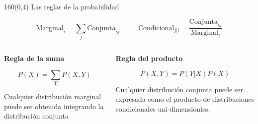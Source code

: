 \documentclass[shownotes,aspectratio=169]{beamer}
\begin{document}
\begin{frame}[plain]
\begin{textblock}{160}(0,4)
\centering \Large Las reglas de la probabilidad
\end{textblock}


\vspace{0.75cm}



\begin{equation*}
  \text{Marginal}_{i} = \sum_j \text{Conjunta}_{ij}  \ \ \ \ \ \ \ \ \ \ \ \  \text{Condicional}_{j|i} = \frac{\text{Conjunta}_{ij}}{\text{Marginal}_{i}}
\end{equation*}

\pause
\vspace{0.75cm}


\begin{columns}[t]
\begin{column}{0.5\textwidth}
 \centering \textbf{Regla de la suma}
 
 
\begin{equation*}
 P(X) = \sum_Y P(X,Y)
\end{equation*}
 
 \justifying \footnotesize
  Cualquier distribución marginal puede ser obtenida integrando la distribución conjunta

 \end{column}
 \begin{column}{0.5\textwidth}
\centering  \textbf{Regla del producto}

\begin{equation*}
 P(X,Y) = P(Y|X) P(X)
\end{equation*}

 \justifying \footnotesize
Cualquier distribución conjunta puede ser expresada como el producto de distribuciones condicionales uni-dimensionles.

\end{column}
\end{columns}

\end{frame}
\end{document}
